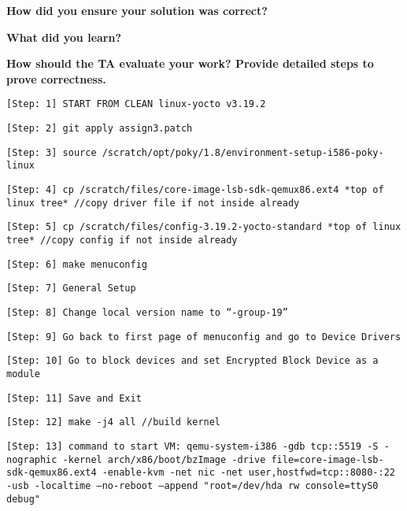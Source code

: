 \documentclass[10pt,letterpaper,draftclsnofoot,onecolumn]{IEEEtran}
\begin{document}
\noindent\textbf{How did you ensure your solution was correct?}


\noindent\textbf{What did you learn?}

\indent{}

\noindent\textbf{How should the TA evaluate your work? Provide detailed steps to prove correctness.}
\begin{description}
\item \texttt{[Step: 1] START FROM CLEAN linux-yocto v3.19.2}
\item \texttt{[Step: 2] git apply assign3.patch}
\item \texttt{[Step: 3] source /scratch/opt/poky/1.8/environment-setup-i586-poky-linux}
\item \texttt{[Step: 4] cp /scratch/files/core-image-lsb-sdk-qemux86.ext4 *top of linux tree* \newline //copy driver file if not inside already}
\item \texttt{[Step: 5] cp /scratch/files/config-3.19.2-yocto-standard *top of linux tree* \newline//copy config if not inside already}
\item \texttt{[Step: 6] make menuconfig}
\item \texttt{[Step: 7] General Setup}
\item \texttt{[Step: 8] Change local version name to “-group-19”}
\item \texttt{[Step: 9] Go back to first page of menuconfig and go to Device Drivers}
\item \texttt{[Step: 10] Go to block devices and set Encrypted Block Device as a module}
\item \texttt{[Step: 11] Save and Exit}
\item \texttt{[Step: 12] make -j4 all \newline //build kernel}
\item \texttt{[Step: 13] command to start VM: \newline qemu-system-i386 -gdb tcp::5519 -S -nographic -kernel arch/x86/boot/bzImage -drive file=core-image-lsb-sdk-qemux86.ext4 -enable-kvm -net nic -net user,hostfwd=tcp::8080-:22 -usb -localtime --no-reboot --append "root=/dev/hda rw console=ttyS0 debug"}

\end{description}
\end{document}

